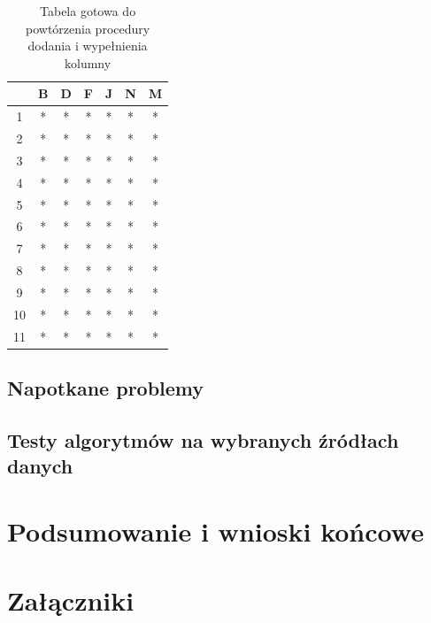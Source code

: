 \documentclass[12pt,twoside]{article}
\begin{document}
\begin{enumerate}[label=\arabic*), leftmargin=1.25cm]
          \begin{table}[ht]
              \caption{Tabela gotowa do powtórzenia procedury dodania i wypełnienia kolumny}
              \centering
              \begin{tabular}{|c|c|c|c|c|c|c|}
                  \hline
                     & B & D & F & J & N & M \\ \hline
                  1  & * & * & * & * & * & * \\ \hline
                  2  & * & * & * & * & * & * \\ \hline
                  3  & * & * & * & * & * & * \\ \hline
                  4  & * & * & * & * & * & * \\ \hline
                  5  & * & * & * & * & * & * \\ \hline
                  6  & * & * & * & * & * & * \\ \hline
                  7  & * & * & * & * & * & * \\ \hline
                  8  & * & * & * & * & * & * \\ \hline
                  9  & * & * & * & * & * & * \\ \hline
                  10 & * & * & * & * & * & * \\ \hline
                  11 & * & * & * & * & * & * \\ \hline
              \end{tabular}
              \label{tab:3_end}
          \end{table}
          \FloatBarrier
\end{enumerate}

\subsection{Napotkane problemy}
\subsection{Testy algorytmów na wybranych źródłach danych}
\clearpage


\section{Podsumowanie i wnioski końcowe}

\clearpage


\section*{Załączniki}
\end{document}
